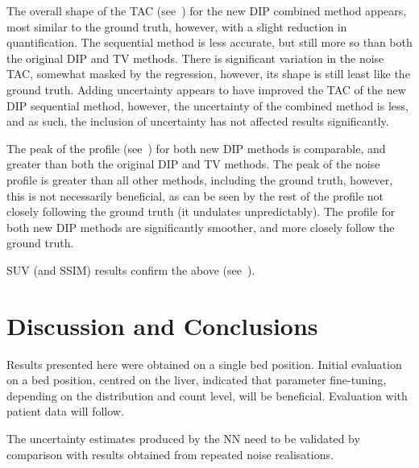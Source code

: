    The overall shape of the \gls{TAC} (see~) for the new \gls{DIP} combined method appears, most similar to the ground truth, however, with a slight reduction in quantification. The sequential method is less accurate, but still more so than both the original \gls{DIP} and \gls{TV} methods. There is significant variation in the noise \gls{TAC}, somewhat masked by the regression, however, its shape is still least like the ground truth. Adding uncertainty appears to have improved the \gls{TAC} of the new \gls{DIP} sequential method, however, the uncertainty of the combined method is less, and as such, the inclusion of uncertainty has not affected results significantly.
    
    The peak of the profile (see~) for both new \gls{DIP} methods is comparable, and greater than both the original \gls{DIP} and \gls{TV} methods. The peak of the noise profile is greater than all other methods, including the ground truth, however, this is not necessarily beneficial, as can be seen by the rest of the profile not closely following the ground truth (it undulates unpredictably). The profile for both new \gls{DIP} methods are significantly smoother, and more closely follow the ground truth.
     
    \acrshort{SUV} (and \acrshort{SSIM}) results confirm the above (see~).


\section{Discussion and Conclusions} \label{sec:discussion_and_conclusions}

    Results presented here were obtained on a single bed position. Initial evaluation on a bed position, centred on the liver, indicated that parameter fine-tuning, depending on the distribution and count level, will be beneficial. Evaluation with patient data will follow.
    
    The uncertainty estimates produced by the \gls{NN} need to be validated by comparison with results obtained from repeated noise realisations.
    
